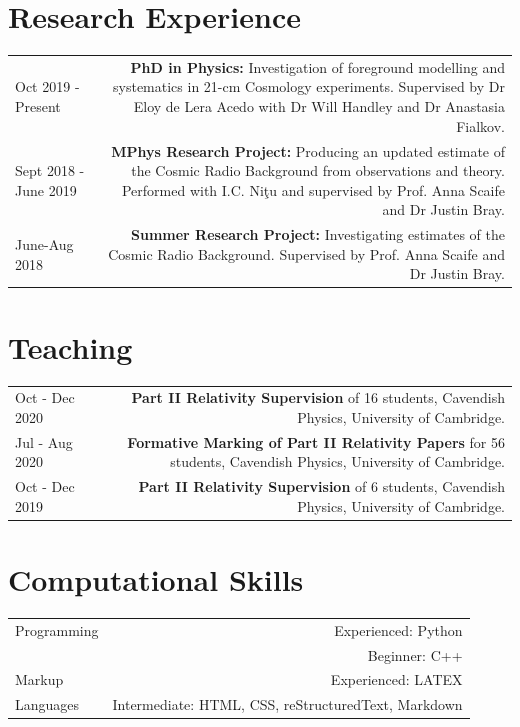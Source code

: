 \documentclass[12pt]{article}
\begin{document}
	\section*{Research Experience}
	
	\begin{tabular}{L!{\vrule}R}
		Oct 2019 - Present & \textbf{PhD in Physics:} Investigation of foreground modelling and systematics in 21-cm Cosmology experiments. Supervised by Dr Eloy de Lera Acedo with Dr Will Handley and Dr Anastasia Fialkov. \\
		Sept 2018 - June 2019 & \textbf{MPhys Research Project:} Producing an updated estimate of the Cosmic Radio Background from observations and theory. Performed with I.C. Ni\c{t}u and supervised by Prof. Anna Scaife and Dr Justin Bray. \\
		June-Aug 2018 & \textbf{Summer Research Project:} Investigating estimates of the Cosmic Radio Background. Supervised by Prof. Anna Scaife and Dr Justin Bray.
	\end{tabular}

	\section*{Teaching}
	
	\begin{tabular}{L!{\vrule}R}
		Oct - Dec 2020 & \textbf{Part II Relativity Supervision} of 16 students, Cavendish Physics, University of Cambridge. \\
		Jul - Aug 2020 & \textbf{Formative Marking of Part II Relativity Papers} for 56 students, Cavendish Physics, University of Cambridge. \\
		Oct - Dec 2019 & \textbf{Part II Relativity Supervision} of 6 students, Cavendish Physics, University of Cambridge.
	\end{tabular}

	\section*{Computational Skills}
	
	\begin{tabular}{L!{\vrule}R}
		Programming & Experienced: Python \\
		& Beginner: C++\\
		Markup& Experienced: LATEX \\
		Languages & Intermediate: HTML, CSS, reStructuredText, Markdown
	\end{tabular}
	
\end{document}
